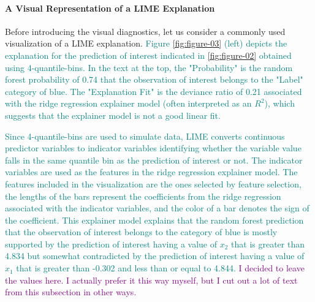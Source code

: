 \documentclass[AMS,STIX2COL]{WileyNJD-v2}\usepackage[]{graphicx}\usepackage[]{color}
\newcommand{\kgc}[1]{\textcolor{purple}{#1}}
\newcommand{\kge}[1]{\textcolor{teal}{#1}}
\renewcommand{\sout}[1]{\unskip}
\begin{document}
\paragraph{A Visual Representation of a LIME Explanation}

Before introducing the visual diagnostics, let us consider a commonly used visualization of a LIME explanation\sout{ that is shown in Figure \ref{fig:figure-03} (left)}. \kge{Figure \ref{fig:figure-03} (left) depicts the explanation for the prediction of interest indicated in \autoref{fig:figure-02} obtained using 4-quantile-bins. In the text at the top, the "Probability" is the random forest probability of 0.74 that the observation of interest belongs to the "Label" category of blue. The "Explanation Fit" is the deviance ratio of 0.21 associated with the ridge regression explainer model (often interpreted as an $R^2$), which suggests that the explainer model is not a good linear fit.}

\kge{Since 4-quantile-bins are used to simulate data, LIME converts continuous predictor variables to indicator variables identifying whether the variable value falls in the same quantile bin as the prediction of interest or not. The indicator variables are used as the features in the ridge regression explainer model. The features included in the visualization are the ones selected by feature selection, the lengths of the bars represent the coefficients from the ridge regression associated with the indicator variables, and the color of a bar denotes the sign of the coefficient. This explainer model explains that the random forest prediction that the observation of interest belongs to the category of blue is mostly supported by the prediction of interest having a value of $x_2$ that is greater than 4.834 but somewhat contradicted by the prediction of interest having a value of $x_1$ that is greater than -0.302 and less than or equal to 4.844.} \kgc{I decided to leave the values here. I actually prefer it this way myself, but I cut out a lot of text from this subsection in other ways.}

\sout{Before introducing the visual diagnostics, let us consider a commonly used visualization of a LIME explanation\sout{ that is shown in Figure \ref{fig:figure-03} (left)}. \kge{Figure \ref{fig:figure-03} (left) shows the explanation for the prediction of interest indicated in \autoref{fig:figure-02} obtained using 4-quantile-bins.} \sout{The plot is created using the \emph{lime} R package and provides a visual representation of a LIME explanation for the prediction of interest indicated in \autoref{fig:figure-02}. In particular, the explanation is obtained using 4-quantile-bins to simulate the data.} \kge{When quantile bins are used to simulate data}\sout{ In this scenario}, LIME converts continuous predictor variables to indicator variables identifying whether the variable value falls in the same quantile bin as the prediction of interest or not. The\kge{n the} indicator variables are used as the explainer model features.}
\end{document}
